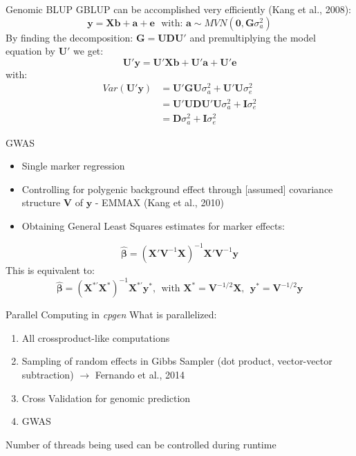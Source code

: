 \documentclass[xcolor=dvipsnames,aspectratio=169]{beamer}
\begin{document}
\begin{frame}{Genomic BLUP}
GBLUP can be accomplished very efficiently (Kang et al., 2008):
\begin{equation*}
\mathbf{y} = \mathbf{Xb} + \mathbf{a} + \mathbf{e} ~~~ \textrm{with: } \mathbf{a} \sim MVN(\mathbf{0},\mathbf{G}\sigma^2_a)
\end{equation*} 
By finding the decomposition: $\mathbf{G=UDU'}$ and premultiplying the model equation by $\mathbf{U'}$ we get:
\begin{equation*}
\mathbf{U'y = U'Xb + U'a + U'e}
\end{equation*} 
with:
\begin{align*}
Var(\mathbf{U'y}) &= \mathbf{U'GU} \sigma^2_a + \mathbf{U'U} \sigma^2_e \\
&=  \mathbf{U'UDU'U}\sigma^2_a + \mathbf{I}\sigma^2_e \\
&= \mathbf{D}\sigma^2_a + \mathbf{I}\sigma^2_e
\end{align*}
\end{frame}



\begin{frame}{GWAS}
\begin{itemize}
\item Single marker regression 
\item Controlling for polygenic background effect through [assumed] covariance structure $\mathbf{V}$ of $\mathbf{y}$ - EMMAX (Kang et al., 2010)
\item Obtaining General Least Squares estimates for marker effects:
\end{itemize}
\begin{equation*}
\hat{\mathbf{\beta}} = (\mathbf{X'V}^{-1}\mathbf{X})^{-1}\mathbf{X'V}^{-1}\mathbf{y}
\end{equation*}
This is equivalent to:
\begin{equation*}
\hat{\mathbf{\beta}} = (\mathbf{X}^{\ast\prime}\mathbf{X}^{\ast})^{-1}\mathbf{X}^{\ast\prime}\mathbf{y}^{\ast} , ~~ \textrm{with   } \mathbf{X}^{\ast} =\mathbf{V}^{-1/2}\mathbf{X}, ~~ \mathbf{y}^{\ast} =\mathbf{V}^{-1/2}\mathbf{y}
\end{equation*}
\end{frame}


\begin{frame}{Parallel Computing in \textit{cpgen}}
What is parallelized:
\begin{enumerate}
\item All crossproduct-like computations
\item Sampling of random effects in Gibbs Sampler (dot product, vector-vector subtraction) $\rightarrow$ Fernando et al., 2014
\item Cross Validation for genomic prediction
\item GWAS
\end{enumerate}

\pause
Number of threads being used can be controlled during runtime
\end{frame}
\end{document}
